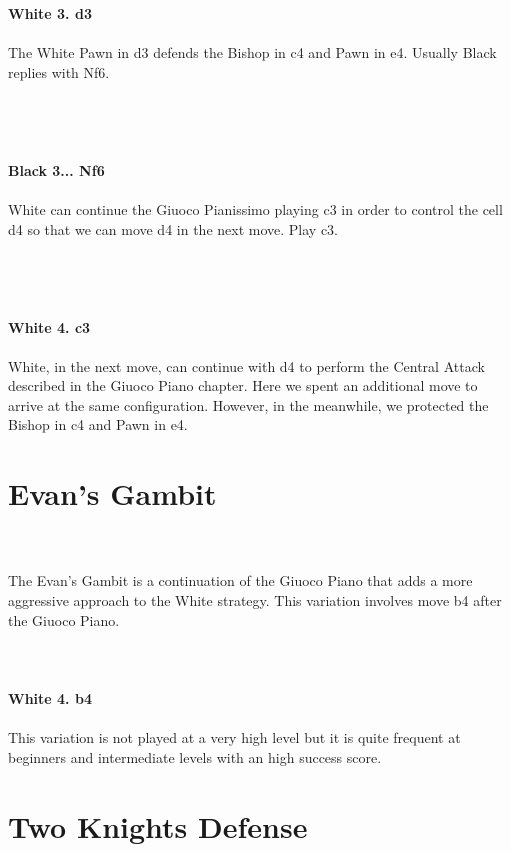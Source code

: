 \documentclass{article}
\begin{document}
\textbf{White 3. d3}\\
\\
The White Pawn in d3 defends the Bishop in c4 and Pawn in e4. Usually Black replies with Nf6.\\\\
\\

\\
\\
\textbf{Black 3... Nf6}\\
\\
White can continue the Giuoco Pianissimo playing c3 in order to control the cell d4 so that we can move d4 in the next move. Play c3.\\\\
\\

\\
\\
\textbf{White 4. c3}\\
\\
White, in the next move, can continue with d4 to perform the Central Attack described in the Giuoco Piano chapter. Here we spent an additional move to arrive at the same configuration. However, in the meanwhile, we protected the Bishop in c4 and Pawn in e4.\\\section{ Evan's Gambit}

\\
\\
The Evan's Gambit is a continuation of the Giuoco Piano that adds a more aggressive approach to the White strategy. This variation involves move b4 after the Giuoco Piano.\\
\\

\\
\\
\textbf{White 4. b4}\\
\\
This variation is not played at a very high level but it is quite frequent at beginners and intermediate levels with an high success score.\\\section{ Two Knights Defense}
\end{document}
